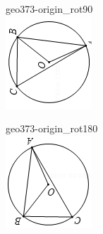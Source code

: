 \documentclass[12pt]{article}
\begin{document}
\begin{center}
\begin{minipage}{0.32\textwidth}
\end{minipage}
\hfill\begin{minipage}{0.32\textwidth}\centering
geo373-origin\_rot90\\
\includegraphics[width=0.95\linewidth]{out_rommath_origin/items/geo373-origin/assets/figure_rot90.png}
\end{minipage}
\par\medskip
\begin{minipage}{0.32\textwidth}\centering
geo373-origin\_rot180\\
\includegraphics[width=0.95\linewidth]{out_rommath_origin/items/geo373-origin/assets/figure_rot180.png}

\end{minipage}
\end{center}
\end{document}
